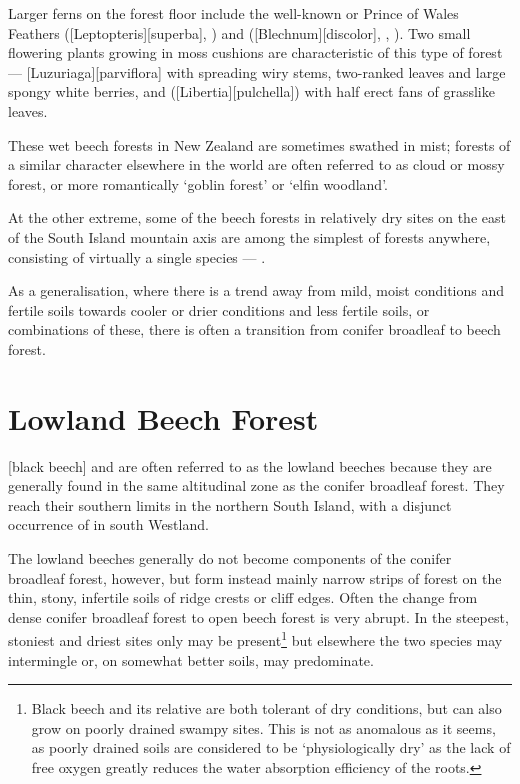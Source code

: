 Larger ferns on the forest floor include the well-known  or Prince of Wales Feathers ([Leptopteris][superba], ) and  ([Blechnum][discolor], , ).
Two small flowering plants growing in moss cushions are characteristic of this type of forest --- [Luzuriaga][parviflora] with spreading wiry stems, two-ranked leaves and large spongy white berries, and  ([Libertia][pulchella]) with half erect fans of grasslike leaves.

These wet beech forests in New Zealand are sometimes swathed in mist; forests of a similar character elsewhere in the world are often referred to as cloud or mossy forest, or more romantically `goblin forest' or `elfin woodland'.

At the other extreme, some of the beech forests in relatively dry sites on the east of the South Island mountain axis are among the simplest of forests anywhere, consisting of virtually a single species --- .

As a generalisation, where there is a trend away from mild, moist conditions and fertile soils towards cooler or drier conditions and less fertile soils, or combinations of these, there is often a transition from conifer broadleaf to beech forest.

\section{Lowland Beech Forest}

[black beech] and  are often referred to as the lowland beeches because they are generally found in the same altitudinal zone as the conifer broadleaf forest.
They reach their southern limits in the northern South Island, with a disjunct occurrence of  in south Westland.

The lowland beeches generally do not become components of the conifer broadleaf forest, however, but form instead mainly narrow strips of forest on the thin, stony, infertile soils of ridge crests or cliff edges.
Often the change from dense conifer broadleaf forest to open beech forest is very abrupt.
In the steepest, stoniest and driest sites only  may be present\footnote{Black beech and its relative  are both tolerant of dry conditions, but can also grow on poorly drained swampy sites. This is not as anomalous as it seems, as poorly drained soils are considered to be `physiologically dry' as the lack of free oxygen greatly reduces the water absorption efficiency of the roots.} but elsewhere the two species may intermingle or, on somewhat better soils,  may predominate.

